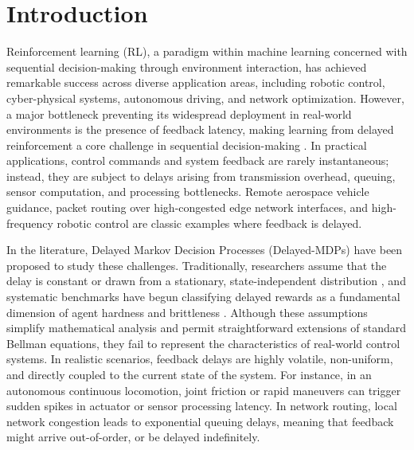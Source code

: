 \documentclass[manuscript, screen, review]{jair}
\begin{document}

\maketitle

\section{Introduction}\label{sec:intro}
Reinforcement learning (RL), a paradigm within machine learning concerned with sequential decision-making through environment interaction, has achieved remarkable success across diverse application areas, including robotic control, cyber-physical systems, autonomous driving, and network optimization. However, a major bottleneck preventing its widespread deployment in real-world environments is the presence of feedback latency, making learning from delayed reinforcement a core challenge in sequential decision-making \citep{kaelbling1996reinforcement}. In practical applications, control commands and system feedback are rarely instantaneous; instead, they are subject to delays arising from transmission overhead, queuing, sensor computation, and processing bottlenecks. Remote aerospace vehicle guidance, packet routing over high-congested edge network interfaces, and high-frequency robotic control are classic examples where feedback is delayed.

In the literature, Delayed Markov Decision Processes (Delayed-MDPs) have been proposed to study these challenges. Traditionally, researchers assume that the delay is constant or drawn from a stationary, state-independent distribution \citep{katsikopoulos2003markov, ramstedt2019realtime}, and systematic benchmarks have begun classifying delayed rewards as a fundamental dimension of agent hardness and brittleness \citep{rajan2023mdp}. Although these assumptions simplify mathematical analysis and permit straightforward extensions of standard Bellman equations, they fail to represent the characteristics of real-world control systems. In realistic scenarios, feedback delays are highly volatile, non-uniform, and directly coupled to the current state of the system. For instance, in an autonomous continuous locomotion, joint friction or rapid maneuvers can trigger sudden spikes in actuator or sensor processing latency. In network routing, local network congestion leads to exponential queuing delays, meaning that feedback might arrive out-of-order, or be delayed indefinitely.
\end{document}
